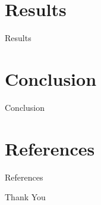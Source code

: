 \documentclass{beamer}
\theoremstyle{remark}
\theoremstyle{plain}
\theoremstyle{plain}
\begin{document}
\section{Results}
\begin{frame}{Results}
\end{frame}

\section{Conclusion}
\begin{frame}{Conclusion}
\end{frame}

\section{References}
\begin{frame}{References}
\end{frame}

\begin{frame}{Thank You}
\end{frame}
\end{document}
